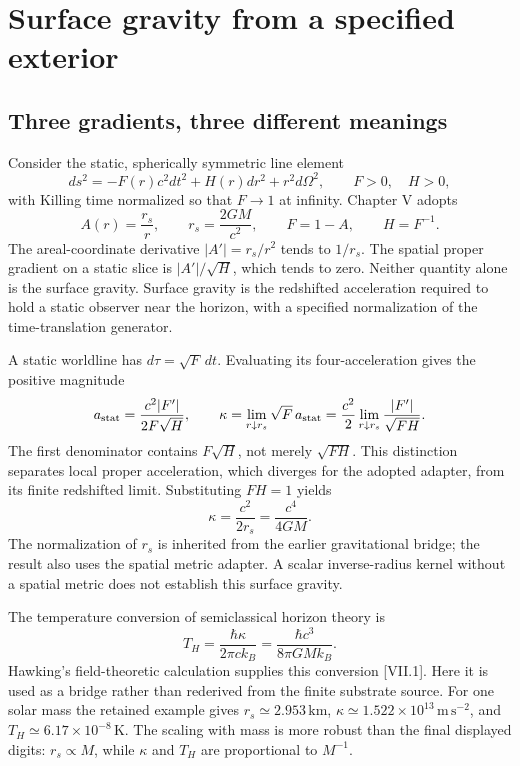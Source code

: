 \section{Surface gravity from a specified exterior}
\subsection{Three gradients, three different meanings}
Consider the static, spherically symmetric line element
\begin{equation}
 ds^2=-F(r)c^2dt^2+H(r)dr^2+r^2d\Omega^2,
 \qquad F>0,\quad H>0,
 \label{c7:metric}
\end{equation}
with Killing time normalized so that $F\to1$ at infinity. Chapter V adopts
\begin{equation}
 A(r)=\frac{r_s}{r},\qquad r_s=\frac{2GM}{c^2},\qquad
 F=1-A,\qquad H=F^{-1}.
 \label{c7:adapter}
\end{equation}
The areal-coordinate derivative $|A'|=r_s/r^2$ tends to $1/r_s$. The spatial proper gradient on a static slice is $|A'|/\sqrt H$, which tends to zero. Neither quantity alone is the surface gravity. Surface gravity is the redshifted acceleration required to hold a static observer near the horizon, with a specified normalization of the time-translation generator.

A static worldline has $d\tau=\sqrt F\,dt$. Evaluating its four-acceleration gives the positive magnitude
\begin{equation}
 a_{\rm stat}=\frac{c^2|F'|}{2F\sqrt H},\qquad
 \kappa=\lim_{r\downarrow r_s}\sqrt F\,a_{\rm stat}
       =\frac{c^2}{2}\lim_{r\downarrow r_s}\frac{|F'|}{\sqrt{FH}}.
 \label{c7:acceleration}
\end{equation}
The first denominator contains $F\sqrt H$, not merely $\sqrt{FH}$. This distinction separates local proper acceleration, which diverges for the adopted adapter, from its finite redshifted limit. Substituting $FH=1$ yields
\begin{equation}
 \kappa=\frac{c^2}{2r_s}=\frac{c^4}{4GM}.
 \label{c7:kappa}
\end{equation}
The normalization of $r_s$ is inherited from the earlier gravitational bridge; the result also uses the spatial metric adapter. A scalar inverse-radius kernel without a spatial metric does not establish this surface gravity.

The temperature conversion of semiclassical horizon theory is
\begin{equation}
 T_H=\frac{\hbar\kappa}{2\pi ck_B}
     =\frac{\hbar c^3}{8\pi GMk_B}.
 \label{c7:temperature}
\end{equation}
Hawking's field-theoretic calculation supplies this conversion [VII.1]. Here it is used as a bridge rather than rederived from the finite substrate source. For one solar mass the retained example gives $r_s\simeq2.953\,\mathrm{km}$, $\kappa\simeq1.522\times10^{13}\,\mathrm{m\,s^{-2}}$, and $T_H\simeq6.17\times10^{-8}\,\mathrm K$. The scaling with mass is more robust than the final displayed digits: $r_s\propto M$, while $\kappa$ and $T_H$ are proportional to $M^{-1}$.

